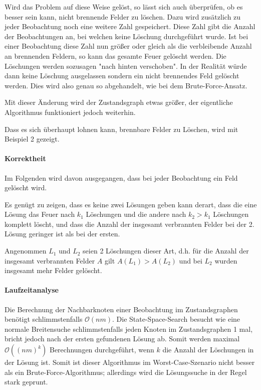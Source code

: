 Wird das Problem auf diese Weise gelöst, so lässt sich auch überprüfen, ob es besser sein kann, nicht brennende Felder zu löschen. Dazu wird zusätzlich zu jeder Beobachtung noch eine weitere Zahl gespeichert. Diese Zahl gibt die Anzahl der Beobachtungen an, bei welchen keine Löschung durchgeführt wurde. Ist bei einer Beobachtung diese Zahl nun größer oder gleich als die verbleibende Anzahl an brennenden Feldern, so kann das gesamte Feuer gelöscht werden. Die Löschungen werden sozusagen "nach hinten verschoben". In der Realität würde dann keine Löschung ausgelassen sondern ein nicht brennendes Feld gelöscht werden. Dies wird also genau so abgehandelt, wie bei dem Brute-Force-Ansatz.

Mit dieser Änderung wird der Zustandsgraph etwas größer, der eigentliche Algorithmus funktioniert jedoch weiterhin.

Dass es sich überhaupt lohnen kann, brennbare Felder zu Löschen, wird mit Beispiel 2 gezeigt.

\paragraph{Korrektheit}

Im Folgenden wird davon ausgegangen, dass bei jeder Beobachtung ein Feld gelöscht wird.

Es genügt zu zeigen, dass es keine zwei Lösungen geben kann derart, dass die eine Lösung das Feuer nach $k_1$ Löschungen und die andere nach $k_2 > k_1$ Löschungen komplett löscht, und dass die Anzahl der insgesamt verbrannten Felder bei der 2. Lösung geringer ist als bei der ersten. 

Angenommen $L_1$ und $L_2$ seien 2 Löschungen dieser Art, d.h. für die Anzahl der insgesamt verbrannten Felder $A$ gilt $A(L_1) > A(L_2)$ und bei $L_2$ wurden insgesamt mehr Felder gelöscht.

\paragraph{Laufzeitanalyse}

Die Berechnung der Nachbarknoten einer Beobachtung im Zustandsgraphen benötigt schlimmstenfalls $\mathcal{O}(nm)$. Die State-Space-Search besucht wie eine normale Breitensuche schlimmstenfalls jeden Knoten im Zustandsgraphen 1 mal, bricht jedoch nach der ersten gefundenen Lösung ab. Somit werden maximal $\mathcal{O}((nm)^k)$ Berechnungen durchgeführt, wenn $k$ die  Anzahl der Löschungen in der Lösung ist.
Somit ist dieser Algorithmus im Worst-Case-Szenario nicht besser als ein Brute-Force-Algorithmus; allerdings wird die Lösungssuche in der Regel stark geprunt.

